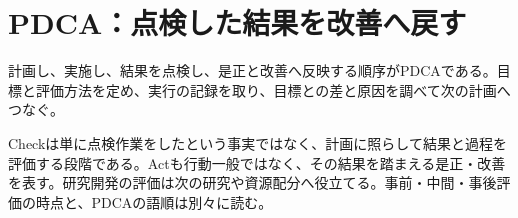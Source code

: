 \section{PDCA：点検した結果を改善へ戻す}
\label{theory:management:pdca}
計画し、実施し、結果を点検し、是正と改善へ反映する順序がPDCAである。目標と評価方法を定め、実行の記録を取り、目標との差と原因を調べて次の計画へつなぐ\parencite{eth54_pdca2017}。

Checkは単に点検作業をしたという事実ではなく、計画に照らして結果と過程を評価する段階である。Actも行動一般ではなく、その結果を踏まえる是正・改善を表す。研究開発の評価は次の研究や資源配分へ役立てる。事前・中間・事後評価の時点と、PDCAの語順は別々に読む。
